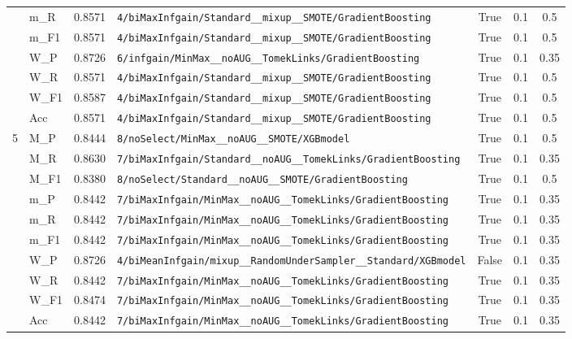 \begin{table}[htbp]
\begin{tabular}{|c|l|c|>{\ttfamily\footnotesize}p{7.2cm}|c|c|c|}
 & m\_R & 0.8571 & \texttt{4/biMaxInfgain/Standard\_\_mixup\_\_SMOTE/GradientBoosting} & True & 0.1 & 0.5 \\
 & m\_F1 & 0.8571 & \texttt{4/biMaxInfgain/Standard\_\_mixup\_\_SMOTE/GradientBoosting} & True & 0.1 & 0.5 \\
 & W\_P & 0.8726 & \texttt{6/infgain/MinMax\_\_noAUG\_\_TomekLinks/GradientBoosting} & True & 0.1 & 0.35 \\
 & W\_R & 0.8571 & \texttt{4/biMaxInfgain/Standard\_\_mixup\_\_SMOTE/GradientBoosting} & True & 0.1 & 0.5 \\
 & W\_F1 & 0.8587 & \texttt{4/biMaxInfgain/Standard\_\_mixup\_\_SMOTE/GradientBoosting} & True & 0.1 & 0.5 \\
 & Acc & 0.8571 & \texttt{4/biMaxInfgain/Standard\_\_mixup\_\_SMOTE/GradientBoosting} & True & 0.1 & 0.5 \\
\hline
\multirow{10}{*}{5} & M\_P & 0.8444 & \texttt{8/noSelect/MinMax\_\_noAUG\_\_SMOTE/XGBmodel} & True & 0.1 & 0.5 \\
 & M\_R & 0.8630 & \texttt{7/biMaxInfgain/Standard\_\_noAUG\_\_TomekLinks/GradientBoosting} & True & 0.1 & 0.35 \\
 & M\_F1 & 0.8380 & \texttt{8/noSelect/Standard\_\_noAUG\_\_SMOTE/GradientBoosting} & True & 0.1 & 0.5 \\
 & m\_P & 0.8442 & \texttt{7/biMaxInfgain/MinMax\_\_noAUG\_\_TomekLinks/GradientBoosting} & True & 0.1 & 0.35 \\
 & m\_R & 0.8442 & \texttt{7/biMaxInfgain/MinMax\_\_noAUG\_\_TomekLinks/GradientBoosting} & True & 0.1 & 0.35 \\
 & m\_F1 & 0.8442 & \texttt{7/biMaxInfgain/MinMax\_\_noAUG\_\_TomekLinks/GradientBoosting} & True & 0.1 & 0.35 \\
 & W\_P & 0.8726 & \texttt{4/biMeanInfgain/mixup\_\_RandomUnderSampler\_\_Standard/XGBmodel} & False & 0.1 & 0.35 \\
 & W\_R & 0.8442 & \texttt{7/biMaxInfgain/MinMax\_\_noAUG\_\_TomekLinks/GradientBoosting} & True & 0.1 & 0.35 \\
 & W\_F1 & 0.8474 & \texttt{7/biMaxInfgain/MinMax\_\_noAUG\_\_TomekLinks/GradientBoosting} & True & 0.1 & 0.35 \\
 & Acc & 0.8442 & \texttt{7/biMaxInfgain/MinMax\_\_noAUG\_\_TomekLinks/GradientBoosting} & True & 0.1 & 0.35 \\
\hline
\end{tabular}
\end{table}